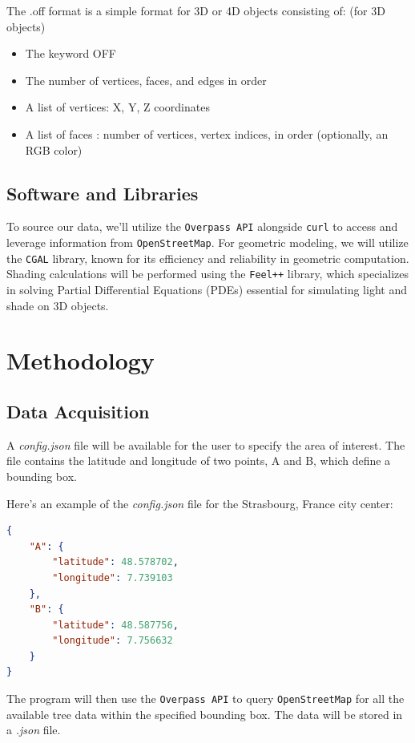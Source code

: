 \documentclass[12pt]{article}
\begin{document}
The .off format\cite{off_format} is a simple format for 3D or 4D objects consisting of: (for 3D objects)
\begin{itemize}
    \item The keyword OFF
    \item The number of vertices, faces, and edges in order 
    \item A list of vertices: X, Y, Z coordinates
    \item A list of faces : number of vertices, vertex indices, in order (optionally, an RGB color)
\end{itemize}

\subsection{Software and Libraries}
To source our data, we'll utilize the \texttt{Overpass API} \cite{overpass} alongside
\texttt{curl} \cite{curl} to access and leverage information from \texttt{OpenStreetMap}.
For geometric modeling, we will utilize the \texttt{CGAL} \cite{cgal} library, known for its efficiency and 
reliability in geometric computation. Shading calculations will be performed using the 
\texttt{Feel++} \cite{feel++} library, which specializes in solving Partial Differential Equations (PDEs) 
essential for simulating light and shade on 3D objects.

\newpage

\section{Methodology}

\subsection{Data Acquisition}
A \textit{config.json} file will be available for the user to specify the area of
interest. The file contains the latitude and longitude of two points, A and B,
which define a bounding box.

Here's an example of the \textit{config.json} file for the Strasbourg, France
city center:

\begin{lstlisting}[language=json,firstnumber=1]
{
    "A": {
        "latitude": 48.578702,
        "longitude": 7.739103
    },
    "B": {
        "latitude": 48.587756,
        "longitude": 7.756632
    }
}
\end{lstlisting}

The program will then use the \texttt{Overpass API} to query \texttt{OpenStreetMap}
for all the available tree data within the specified bounding box.
The data will be stored in a \textit{.json} file.
\end{document}

